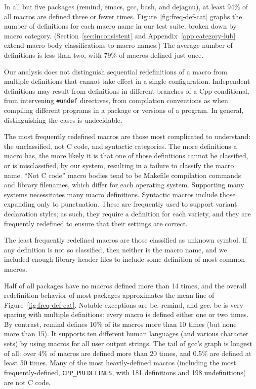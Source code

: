 \documentclass[10pt]{article}
\newcommand{\pkg}[1]{\textsf{#1}}
\begin{document}
In all but five packages (\pkg{remind}, \pkg{emacs}, \pkg{gcc}, \pkg{bash},
and \pkg{dejagnu}), at least 94\% of all macros are defined three or fewer
times.  Figure~\ref{fig:freq-def-cat} graphs the number of definitions for
each macro name in our test suite, broken down by macro category.
(Section~\ref{sec:inconsistent} and Appendix~\ref{app:category-lub} extend
macro body classifications to macro names.)  The average number of
definitions is less than two, with 79\% of macros defined just once.

Our analysis does not distinguish sequential redefinitions of a macro from
multiple definitions that cannot take effect in a single configuration.
Independent definitions may result from definitions in different branches
of a Cpp conditional, from intervening {\tt \#undef} directives, from
compilation conventions as when compiling different programs in a package
or versions of a program.  In general, distinguishing the cases is
undecidable.

The most frequently redefined macros are those most complicated to
understand: the unclassified, not C code, and syntactic categories.  The
more definitions a macro has, the more likely it is that one of those
definitions cannot be classified, or is misclassified, by our system,
resulting in a failure to classify the macro name.  ``Not C code'' macro
bodies tend to be Makefile compilation commands and library filenames,
which differ for each operating system.  Supporting many systems
necessitates many macro definitions.  Syntactic macros include those
expanding only to punctuation.  These are frequently used to support
variant declaration styles; as such, they require a definition for each
variety, and they are frequently redefined to ensure that their settings
are correct.


The least frequently redefined macros are those classified as unknown
symbol.  If any definition is not so classified, then neither is the
macro name, and we included enough library header files to include some
definition of most common macros.

Half of all packages have no macros defined more than 14 times, and the
overall redefinition behavior of most packages approximates the mean line
of Figure~\ref{fig:freq-def-cat}.  Notable exceptions are \pkg{bc},
\pkg{remind}, and \pkg{gcc}.  \pkg{bc} is very sparing with multiple
definitions: every macro is defined either one or two times.  By contrast, 
\pkg{remind} defines 10\% of its macros more than 10 times (but none more
than 15).  It supports ten different human languages (and various character
sets) by using macros for all user output strings.  The tail of \pkg{gcc}'s
graph is longest of all: over 4\% of macros are defined more than 20 times,
and 0.5\% are defined at least 50 times.  Many of the most heavily-defined
macros (including the most frequently-defined, \verb|CPP_PREDEFINES|, with
181 definitions and 198 undefinitions) are not C code.
\end{document}
